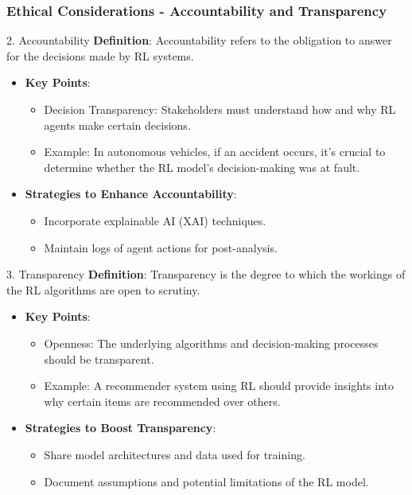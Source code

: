 \documentclass[aspectratio=169]{beamer}
\begin{document}
\begin{frame}[fragile]
    \frametitle{Ethical Considerations - Accountability and Transparency}
    \begin{block}{2. Accountability}
        \textbf{Definition}: Accountability refers to the obligation to answer 
        for the decisions made by RL systems.
    \end{block}
    \begin{itemize}
        \item \textbf{Key Points}:
        \begin{itemize}
            \item Decision Transparency: Stakeholders must understand how and why RL agents make certain decisions.
            \item Example: In autonomous vehicles, if an accident occurs, it's crucial to determine whether the RL model's decision-making was at fault.
        \end{itemize}
        \item \textbf{Strategies to Enhance Accountability}:
        \begin{itemize}
            \item Incorporate explainable AI (XAI) techniques.
            \item Maintain logs of agent actions for post-analysis.
        \end{itemize}
    \end{itemize}

    \begin{block}{3. Transparency}
        \textbf{Definition}: Transparency is the degree to which the workings 
        of the RL algorithms are open to scrutiny.
    \end{block}
    \begin{itemize}
        \item \textbf{Key Points}:
        \begin{itemize}
            \item Openness: The underlying algorithms and decision-making processes should be transparent.
            \item Example: A recommender system using RL should provide insights into why certain items are recommended over others.
        \end{itemize}
        \item \textbf{Strategies to Boost Transparency}:
        \begin{itemize}
            \item Share model architectures and data used for training.
            \item Document assumptions and potential limitations of the RL model.
        \end{itemize}
    \end{itemize}
\end{frame}
\end{document}
